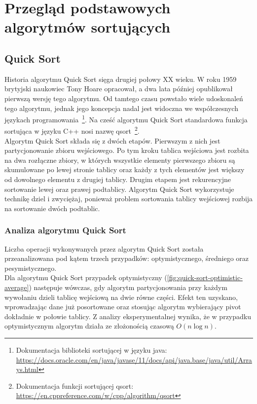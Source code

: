 \chapter{Przegląd podstawowych algorytmów sortujących}
\thispagestyle{chapterBeginStyle}


\section{Quick Sort}


Historia algorytmu Quick Sort sięga drugiej połowy XX wieku. W roku 1959 brytyjski naukowiec Tony Hoare
opracował, a dwa lata później opublikował pierwszą wersję tego algorytmu. Od tamtego czasu powstało wiele
udoskonaleń tego algorytmu, jednak jego koncepcja nadal jest widoczna we współczesnych językach programowania
\,\footnote{Dokumentacja biblioteki sortującej w języku java: \url{https://docs.oracle.com/en/java/javase/11/docs/api/java.base/java/util/Arrays.html}}.
Na cześć algorytmu Quick Sort standardowa funkcja sortująca w języku C++ nosi nazwę qsort
\,\footnote{Dokumentacja funkcji sortującej qsort:
\url{https://en.cppreference.com/w/cpp/algorithm/qsort}}.\\

Algorytm Quick Sort składa się z dwóch etapów. Pierwszym z nich jest partycjonowanie zbioru wejściowego.
Po tym kroku tablica wejściowa jest rozbita na dwa rozłączne zbiory, w których wszystkie elementy pierwszego
zbioru są skumulowane po lewej stronie tablicy oraz każdy z tych elementów jest większy od dowolnego elementu
z drugiej tablicy. Drugim etapem jest rekurencyjne sortowanie lewej oraz prawej podtablicy.
Algorytm Quick Sort wykorzystuje technikę dziel i zwyciężaj, ponieważ problem sortowania tablicy wejściowej
rozbija na sortowanie dwóch podtablic.


\subsection{Analiza algorytmu Quick Sort}

Liczba operacji wykonywanych przez algorytm Quick Sort została przeanalizowana pod kątem trzech przypadków:
optymistycznego, średniego oraz pesymistycznego.\\

Dla algorytmu Quick Sort przypadek optymistyczny (\ref{fig:quick-sort-optimistic-average}) następuje wówczas, gdy algorytm partycjonowania przy każdym wywołaniu dzieli tablicę wejściową na dwie równe części. Efekt ten uzyskano, wprowadzając dane już posortowane oraz stosując algorytm wybierający pivot dokładnie w połowie tablicy. Z analizy eksperymentalnej wynika, że w przypadku optymistycznym algorytm działa ze złożonością czasową $O(n\log{}n)$.\\

